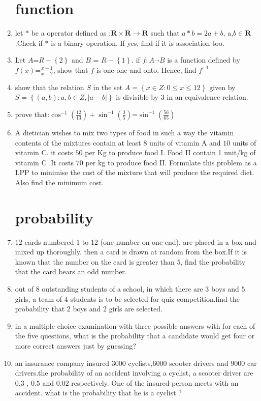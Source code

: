 \documentclass[12pt,-letter paper]{article}
\providecommand{\cbrak}[1]{\ensuremath{\left\{#1\right\}}}
\providecommand{\brak}[1]{\ensuremath{\left(#1\right)}}
\providecommand{\abs}[1]{\left\vert#1\right\vert}
\begin{document}
\begin{enumerate}
\section{function}
 \item let $*$ be a operator defined as :$\textbf{R}\times\textbf{R}\rightarrow\textbf{R}$ such that $a*b=2a+b,\,$a,$b\in\textbf{R}$ .Check if $*$ is a binary operation. If yes, find if it is association too.
 \item Let $A$=$R-\cbrak{2}$ and $B$ = $R-\cbrak{1}$. if $f:A \overrightarrow{} B$ is a function defined by $f\brak{x}$=$\frac{x-1}{x-2}$, show that $f$ is one-one and onto. Hence, find $f^{-1}$ 
\item show that the relation $S$ in the set $A = \cbrak{x\in Z : 0\leq x \leq 12}$ given by $S = \cbrak{(a,b):a,b\in Z,  \abs{a-b}}$ is divisible by $3$ in an equivalence relation.
\item prove that:$\cos^{-1}(\frac{12}{13})+\sin^{-1}(\frac{3}{5})$=$\sin^{-1}(\frac{56}{65})$
 \item A dietician wishes to mix two types of food in such a way the vitamin contents of the mixtures contain at least \rupee $8$ units of vitamin A and \rupee $10$ units of vitamin C. it costs \rupee $50$ per Kg to produce food I. Food II contain 1 unit/kg of vitamin C .It costs \rupee $70$ per kg to produce food II. Formulate this problem as a LPP to minimise the cost of the mixture that will produce the required diet. Also find the minimum cost.
 \section{probability}
 \item $12$ cards numbered $1$ to $12$ (one number on one end), are placed in a box and mixed up thoroughly. then a card is drawn at random from the box.If it is known that the number on the card is greater than $5$, find the probability that the card bears an odd number.
\item out of $8$ outstanding students of a school, in which there are $3$ boys and $5$ girls, a team of $4$ students is to be selected for quiz competition.find the probability that $2$ boys and $2$ girls are selected.
\item in a multiple choice examination with three possible answers with for each of the five questions, what is the probability that a candidate would get four or more correct answers just by guessing?
\item an insurance company insured $3000$ cyclists,$6000$ scooter drivers and $9000$ car drivers.the probability of an accident involving a cyclist, a scooter driver are $0.3$ , $0.5$ and $0.02$ respectively. One of the insured person meets with an accident. what is the probability that he is a cyclist ?

\end{enumerate}
\end{document}

